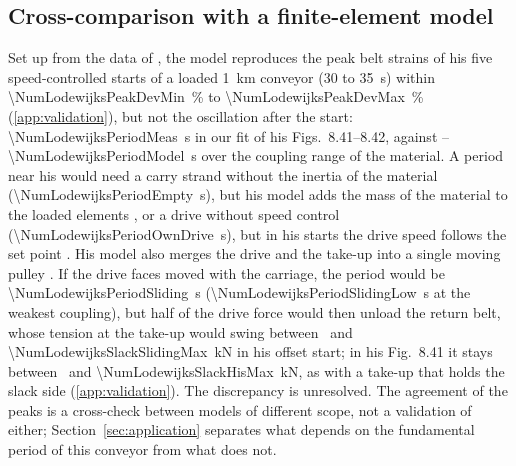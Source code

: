 \subsection{Cross-comparison with a finite-element model}\label{sec:lodewijks}

Set up from the data of \citet[Ch.~8]{lodewijks1996}, the model reproduces the peak belt
strains of his five speed-controlled starts of a loaded \qty{1}{\kilo\metre} conveyor (30 to
\qty{35}{\second}) within \qty{\NumLodewijksPeakDevMin}{\percent} to
\qty{\NumLodewijksPeakDevMax}{\percent} (\cref{app:validation}), but not the oscillation after
the start: \qty{\NumLodewijksPeriodMeas}{\second} in our fit of his Figs.~8.41--8.42, against
\NumLoPeriodLow--\qty{\NumLodewijksPeriodModel}{\second} over the coupling range of the
material. A period near his would need a carry strand without the inertia of the material
(\qty{\NumLodewijksPeriodEmpty}{\second}), but his model adds the mass of the material to the
loaded elements \citep[\S8.4]{lodewijks1996}, or a drive without speed control
(\qty{\NumLodewijksPeriodOwnDrive}{\second}), but in his starts the drive speed follows the set
point \citep[Fig.~8.38]{lodewijks1996}. His model also merges the drive and the take-up into a
single moving pulley \citep[\S7.2, Eq.~7.55]{lodewijks1996}. If the drive faces moved with the
carriage, the period would be \qty{\NumLodewijksPeriodSliding}{\second}
(\qty{\NumLodewijksPeriodSlidingLow}{\second} at the weakest coupling), but half of the drive force
would then unload the return belt, whose tension at the take-up would swing
between \NumLodewijksSlackSlidingMin\ and \qty{\NumLodewijksSlackSlidingMax}{\kilo\newton} in his
offset start; in his Fig.~8.41 it stays between \NumLodewijksSlackHisMin\ and
\qty{\NumLodewijksSlackHisMax}{\kilo\newton}, as with a take-up that holds the slack side
(\cref{app:validation}). The discrepancy is unresolved. The agreement of the peaks is a
cross-check between models of different scope, not a validation of either;
Section~\ref{sec:application} separates what depends on the fundamental period of this conveyor
from what does not.
